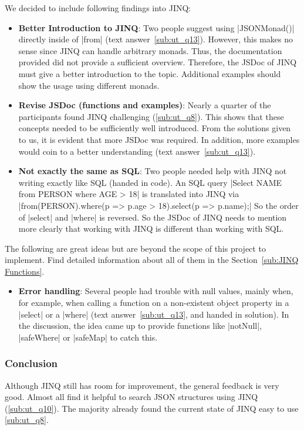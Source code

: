 We decided to include following findings into JINQ:
\begin{itemize}
  \item \textbf{Better Introduction to JINQ}: Two people suggest using
    |JSONMonad()| directly inside of |from| (text answer~\ref{sub:ut_q13}).
    However, this makes no sense since JINQ can handle arbitrary monads. Thus,
    the documentation provided did not provide a sufficient overview.
    Therefore, the JSDoc of JINQ must give a better introduction to the topic.
    Additional examples should show the usage using different monads.
  \item \textbf{Revise JSDoc (functions and examples)}: Nearly a quarter of the participants found JINQ
    challenging (\ref{sub:ut_q8}). This shows that these concepts needed to be
    sufficiently well introduced. From the solutions given to us, it is evident
    that more JSDoc was required. In addition, more examples would coin to a
    better understanding (text answer~\ref{sub:ut_q13}).
    \item \textbf{Not exactly the same as SQL}: Two people needed help with
      JINQ not writing exactly like SQL (handed in code). An SQL query
      |Select NAME from PERSON where AGE > 18| is translated into JINQ via
      |from(PERSON).where(p => p.age > 18).select(p => p.name);| So the order
      of |select| and |where| is reversed. So the JSDoc of JINQ needs to
      mention more clearly that working with JINQ is different than working
      with SQL.
\end{itemize}

The following are great ideas but are beyond the scope of this project to
implement. Find detailed information about all of them in the
Section~\ref{sub:JINQ Functions}.
\begin{itemize}
  \item \textbf{Error handling}: Several people had trouble with null values,
    mainly when, for example, when calling a  function on a non-existent object
    property in a |select| or a |where| (text answer~\ref{sub:ut_q13}, and
    handed in solution). In the discussion, the idea came up to
    provide functions like |notNull|, |safeWhere| or |safeMap| to catch this.
\end{itemize}
\subsubsection{Conclusion} %
\label{sec:Conclusion}
Although JINQ still has room for improvement, the general feedback is very
good. Almost all find it helpful to search JSON structures using JINQ
(\ref{sub:ut_q10}). The majority already found the current state of JINQ easy
to use \ref{sub:ut_q8}.

